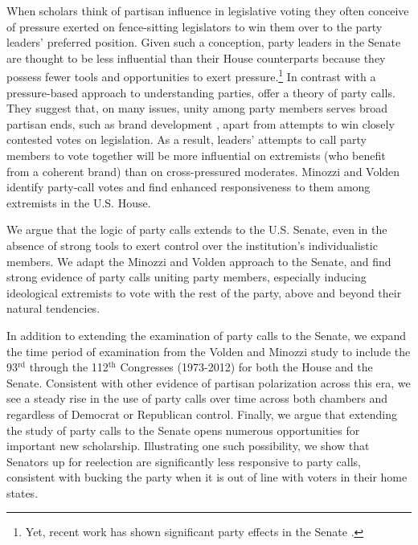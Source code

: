\documentclass[12pt]{article}
\begin{document}
\noindent When scholars think of partisan influence in legislative voting they often conceive of pressure exerted on fence-sitting legislators to win them over to the party leaders' preferred position.  Given such a conception, party leaders in the Senate are thought to be less influential than their House counterparts because they possess fewer tools and opportunities to exert pressure.\footnote{\doublespacing\normalsize Yet, recent work has shown significant party effects in the Senate
\citep[e.g.,][]{Gailmard:2007, Monroe:2008, Patty:2008, Volden:2006}.
} In contrast with a pressure-based approach to understanding parties, \cite{Minozzi:2013} offer a theory of party calls. They suggest that, on many issues, unity among party members serves broad partisan ends, such as brand development
\citep[e.g.,][]{Snyder:2002}, apart from attempts to win closely contested votes on legislation. As a result, leaders' attempts to call party members to vote together will be more influential on extremists (who benefit from a coherent brand) than on cross-pressured moderates. Minozzi and Volden identify party-call votes and find enhanced responsiveness to them among extremists in the U.S. House.

We argue that the logic of party calls extends to the U.S. Senate, even in the absence of strong tools to exert control over the institution's individualistic members. We adapt the Minozzi and Volden approach to the Senate, and find strong evidence of party calls uniting party members, especially inducing ideological extremists to vote with the rest of the party, above and beyond their natural tendencies.

In addition to extending the examination of party calls to the Senate, we expand the time period of examination from the Volden and Minozzi study to include the 93$^{\text{rd}}$ through the 112$^{\text{th}}$ Congresses (1973-2012) for both the House and the Senate. Consistent with other evidence of partisan polarization across this era, we see a steady rise in the use of party calls over time across both chambers and regardless of Democrat or Republican control. Finally, we argue that extending the study of party calls to the Senate opens numerous opportunities for important new scholarship. Illustrating one such possibility, we show that Senators up for reelection are significantly less responsive to party calls, consistent with bucking the party when it is out of line with voters in their home states.
\end{document}
